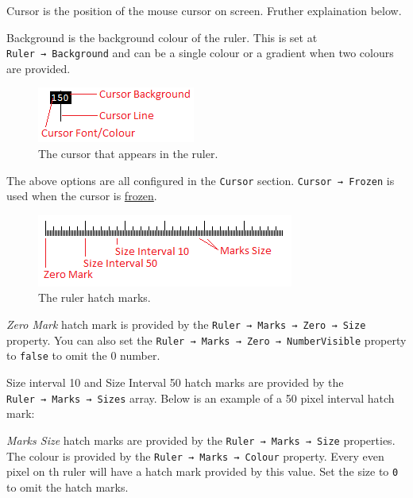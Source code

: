 \documentclass[
]{book}
\newenvironment{Shaded}{\begin{snugshade}}{\end{snugshade}}
\newcommand{\CommentTok}[1]{\textcolor[rgb]{0.56,0.35,0.01}{\textit{#1}}}
\begin{document}
Cursor is the position of the mouse cursor on screen.
Fruther explaination below.

Background is the background colour of the ruler.
This is set at \texttt{Ruler\ →\ Background} and can be a single colour or a gradient when two colours are provided.

\begin{figure}
\centering
\includegraphics{images/ruler-cursor.png}
\caption{\label{fig:unnamed-chunk-9}The cursor that appears in the ruler.}
\end{figure}

The above options are all configured in the \texttt{Cursor} section.
\texttt{Cursor\ →\ Frozen} is used when the cursor is \protect\hyperlink{freeze}{frozen}.

\begin{figure}
\centering
\includegraphics{images/ruler-hashmarks.png}
\caption{\label{fig:unnamed-chunk-10}The ruler hatch marks.}
\end{figure}

\emph{Zero Mark} hatch mark is provided by the \texttt{Ruler\ →\ Marks\ →\ Zero\ →\ Size} property.
You can also set the \texttt{Ruler\ →\ Marks\ →\ Zero\ →\ NumberVisible} property to \texttt{false} to omit the 0 number.

Size interval 10 and Size Interval 50 hatch marks are provided by the \texttt{Ruler\ →\ Marks\ →\ Sizes} array.
Below is an example of a 50 pixel interval hatch mark:

\begin{Shaded}
\end{Shaded}

\emph{Marks Size} hatch marks are provided by the \texttt{Ruler\ →\ Marks\ →\ Size} properties.
The colour is provided by the \texttt{Ruler\ →\ Marks\ →\ Colour} property.
Every even pixel on th ruler will have a hatch mark provided by this value.
Set the size to \texttt{0} to omit the hatch marks.
\end{document}
